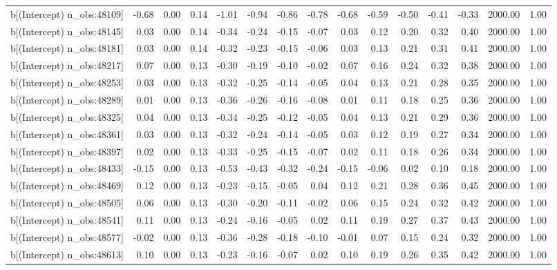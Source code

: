 \begin{table}[ht]
\begin{tabular}{rrrrrrrrrrrrrrr}
  b[(Intercept) n\_obs:48109] & -0.68 & 0.00 & 0.14 & -1.01 & -0.94 & -0.86 & -0.78 & -0.68 & -0.59 & -0.50 & -0.41 & -0.33 & 2000.00 & 1.00 \\ 
  b[(Intercept) n\_obs:48145] & 0.03 & 0.00 & 0.14 & -0.34 & -0.24 & -0.15 & -0.07 & 0.03 & 0.12 & 0.20 & 0.32 & 0.40 & 2000.00 & 1.00 \\ 
  b[(Intercept) n\_obs:48181] & 0.03 & 0.00 & 0.14 & -0.32 & -0.23 & -0.15 & -0.06 & 0.03 & 0.13 & 0.21 & 0.31 & 0.41 & 2000.00 & 1.00 \\ 
  b[(Intercept) n\_obs:48217] & 0.07 & 0.00 & 0.13 & -0.30 & -0.19 & -0.10 & -0.02 & 0.07 & 0.16 & 0.24 & 0.32 & 0.38 & 2000.00 & 1.00 \\ 
  b[(Intercept) n\_obs:48253] & 0.03 & 0.00 & 0.13 & -0.32 & -0.25 & -0.14 & -0.05 & 0.04 & 0.13 & 0.21 & 0.28 & 0.35 & 2000.00 & 1.00 \\ 
  b[(Intercept) n\_obs:48289] & 0.01 & 0.00 & 0.13 & -0.36 & -0.26 & -0.16 & -0.08 & 0.01 & 0.11 & 0.18 & 0.25 & 0.36 & 2000.00 & 1.00 \\ 
  b[(Intercept) n\_obs:48325] & 0.04 & 0.00 & 0.13 & -0.34 & -0.25 & -0.12 & -0.05 & 0.04 & 0.13 & 0.21 & 0.29 & 0.36 & 2000.00 & 1.00 \\ 
  b[(Intercept) n\_obs:48361] & 0.03 & 0.00 & 0.13 & -0.32 & -0.24 & -0.14 & -0.05 & 0.03 & 0.12 & 0.19 & 0.27 & 0.34 & 2000.00 & 1.00 \\ 
  b[(Intercept) n\_obs:48397] & 0.02 & 0.00 & 0.13 & -0.33 & -0.25 & -0.15 & -0.07 & 0.02 & 0.11 & 0.18 & 0.26 & 0.34 & 2000.00 & 1.00 \\ 
  b[(Intercept) n\_obs:48433] & -0.15 & 0.00 & 0.13 & -0.53 & -0.43 & -0.32 & -0.24 & -0.15 & -0.06 & 0.02 & 0.10 & 0.18 & 2000.00 & 1.00 \\ 
  b[(Intercept) n\_obs:48469] & 0.12 & 0.00 & 0.13 & -0.23 & -0.15 & -0.05 & 0.04 & 0.12 & 0.21 & 0.28 & 0.36 & 0.45 & 2000.00 & 1.00 \\ 
  b[(Intercept) n\_obs:48505] & 0.06 & 0.00 & 0.13 & -0.30 & -0.20 & -0.11 & -0.02 & 0.06 & 0.15 & 0.24 & 0.32 & 0.42 & 2000.00 & 1.00 \\ 
  b[(Intercept) n\_obs:48541] & 0.11 & 0.00 & 0.13 & -0.24 & -0.16 & -0.05 & 0.02 & 0.11 & 0.19 & 0.27 & 0.37 & 0.43 & 2000.00 & 1.00 \\ 
  b[(Intercept) n\_obs:48577] & -0.02 & 0.00 & 0.13 & -0.36 & -0.28 & -0.18 & -0.10 & -0.01 & 0.07 & 0.15 & 0.24 & 0.32 & 2000.00 & 1.00 \\ 
  b[(Intercept) n\_obs:48613] & 0.10 & 0.00 & 0.13 & -0.23 & -0.16 & -0.07 & 0.02 & 0.10 & 0.19 & 0.26 & 0.35 & 0.42 & 2000.00 & 1.00 \\ 

\end{tabular}
\end{table}
